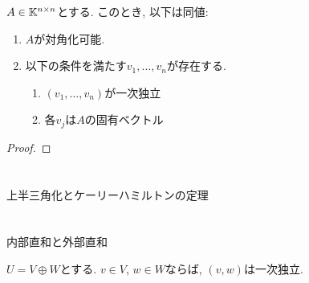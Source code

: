 \begin{prop}
  $A\in\mathbb{K}^{n\times n}$とする.
  このとき, 以下は同値:
  \begin{enumerate}
  \item $A$が対角化可能.
  \item
    以下の条件を満たす$v_1,\ldots,v_n$が存在する.
\begin{enumerate}
\item $(v_1,\ldots,v_n)$が一次独立
\item  各$v_j$は$A$の固有ベクトル
  \end{enumerate}
  \end{enumerate}
\end{prop}
\begin{proof}\end{proof}



\begin{quiz}
\end{quiz}


\chapter{}
\begin{quiz}
\end{quiz}


\chapter{}
上半三角化とケーリーハミルトンの定理
\begin{quiz}
\end{quiz}




\chapter{}
内部直和と外部直和
\begin{prop}
  $U=V\oplus W$とする.
  $v\in V$, $w\in W$ならば,
  $(v,w)$は一次独立.
\end{prop}

